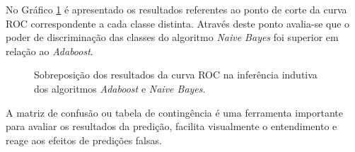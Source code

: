 No Gráfico \ref{graphic:roc} é apresentado os resultados referentes 
ao ponto de corte da curva ROC correspondente a cada classe distinta. Através 
deste ponto avalia-se que o poder de discriminação das classes do algoritmo 
\textit{Naive Bayes} foi superior em relação ao \textit{Adaboost}. 

\begin{figure}[H]
    \begin{center}
    \end{center}
    \caption{Sobreposição dos resultados da curva ROC na inferência 
    indutiva dos algoritmos \textit{Adaboost} e \textit{Naive Bayes}.}
    \label{graphic:roc}
\end{figure}

A matriz de confusão ou tabela de contingência é uma ferramenta importante para 
avaliar os resultados da predição, facilita visualmente o entendimento e reage 
aos efeitos de predições falsas.

